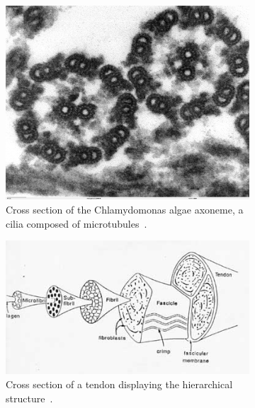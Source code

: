 \begin{figure}\centering%
  \begin{subfigure}{0.3\linewidth}\centering
    \includegraphics[height=\myMinHeight]{img/Chlamydomonas_TEM_17}
    \caption{Cross section of the Chlamydomonas algae axoneme, a cilia composed of microtubules~\cite{wikimediacommons2007cilia}.}\label{fig:material_examples:microtubule}
  \end{subfigure}%
  \hfill
  \begin{subfigure}{0.3\linewidth}\centering
    \includegraphics[height=\myMinHeight]{img/ligten2}
    \caption{Cross section of a tendon displaying the hierarchical structure~\cite{lecture_biosolid_mechanics}.}\label{fig:material_examples:tendon}
  \end{subfigure}%
  \hfill
  \begin{subfigure}{0.3\linewidth}\centering

\end{subfigure}
\end{figure}

